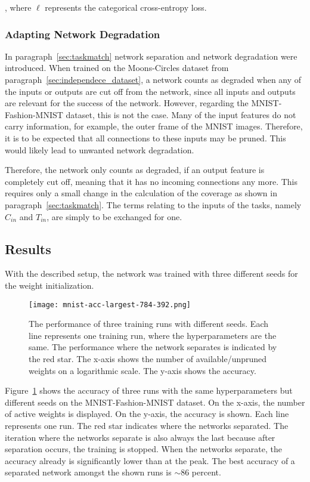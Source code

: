 , where $\ell$ represents the categorical cross-entropy loss.

\subsubsection{Adapting Network Degradation}
In paragraph~\ref{sec:taskmatch} network separation and network degradation were introduced.
When trained on the Moons-Circles dataset from paragraph~\ref{sec:independece_dataset}, a network counts as degraded when any of the inputs or outputs are cut off from the network, since all inputs and outputs are relevant for the success of the network.
However, regarding the MNIST-Fashion-MNIST dataset, this is not the case.
Many of the input features do not carry information, for example, the outer frame of the MNIST images.
Therefore, it is to be expected that all connections to these inputs may be pruned.
This would likely lead to unwanted network degradation.

Therefore, the network only counts as degraded, if an output feature is completely cut off, meaning that it has no incoming connections any more.
This requires only a small change in the calculation of the coverage as shown in paragraph~\ref{sec:taskmatch}.
The terms relating to the inputs of the tasks, namely $C_{in}$ and $T_{in}$, are simply to be exchanged for one.

\subsection{Results}
With the described setup, the network was trained with three different seeds for the weight initialization.

\begin{figure}[ht]
    \centering
    \texttt{[image: mnist-acc-largest-784-392.png]}
    \caption[Performance and Separation on MNIST-Fashion-MNIST]{The performance of three training runs with different seeds. 
    Each line represents one training run, where the hyperparameters are the same.
    The performance where the network separates is indicated by the red star.
    The x-axis shows the number of available/unpruned weights on a logarithmic scale.
    The y-axis shows the accuracy.
    }\label{fig:mnist-acc}
\end{figure}
Figure~\ref{fig:mnist-acc} shows the accuracy of three runs with the same hyperparameters but different seeds on the MNIST-Fashion-MNIST dataset.
On the x-axis, the number of active weights is displayed.
On the y-axis, the accuracy is shown.
Each line represents one run.
The red star indicates where the networks separated.
The iteration where the networks separate is also always the last because after separation occurs, the training is stopped.
When the networks separate, the accuracy already is significantly lower than at the peak.
The best accuracy of a separated network amongst the shown runs is $\sim86$ percent.

